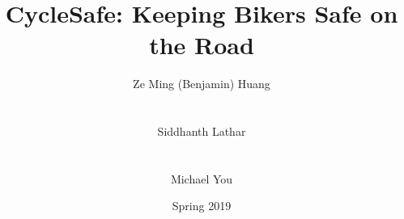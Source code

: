 \usepackage[margin=1in]{geometry}
\usepackage{amsmath, amsthm, amssymb}
\usepackage{cite}
\usepackage{enumitem}
\usepackage{float}
\usepackage{graphicx}
\usepackage{hyperref}
\usepackage{mathtools}
\usepackage[super]{nth}
\usepackage{physics}
\usepackage{url}

\title{CycleSafe: Keeping Bikers Safe on the Road}
\author{Ze Ming (Benjamin) Huang \\
         \\\\
        Siddhanth Lathar \\
         \\\\
        Michael You \\
        }
\date{Spring 2019}

\newcommand{\te}[1]{\texttt{#1}} %

\DeclarePairedDelimiter{\ceil}{\lceil}{\rceil}
\DeclarePairedDelimiter{\floor}{\lfloor}{\rfloor}
\DeclarePairedDelimiter{\paren}{(}{)}
\DeclarePairedDelimiter{\bracken}{[}{]}
\newcommand{\pa}[1]{\paren*{#1}}
\newcommand{\pbra}[1]{\bracken*{#1}}

\usepackage{listings, lstautogobble}
\usepackage{color}
\usepackage[T1]{fontenc}


\makeatletter
\newcommand\BeraMonottfamily{%
  \def\fvm@Scale{0.80}%
  \fontfamily{fvm}\selectfont%
}
\makeatother

